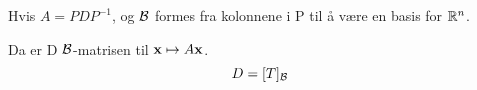 Hvis $A = PDP^{-1}$, og $\mathcal{B}$ formes fra kolonnene i P
til å være en basis for $\mathbb{R}^n$.

Da er D $\mathcal{B}$-matrisen til $\mathbf{x} \mapsto A\mathbf{x}$.
$$D = [T]_{\mathcal{B}}$$
